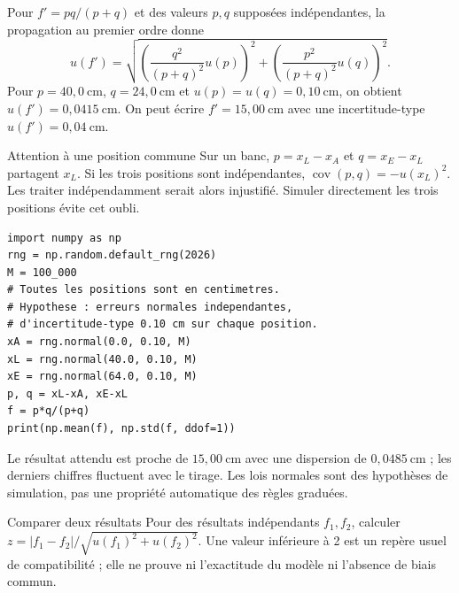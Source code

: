 Pour $f'=pq/(p+q)$ et des valeurs $p,q$ supposées indépendantes, la propagation au premier ordre donne
\[u(f')=\sqrt{\left(\frac{q^2}{(p+q)^2}u(p)\right)^2+
\left(\frac{p^2}{(p+q)^2}u(q)\right)^2}.\]
Pour $p=40{,}0\ \mathrm{cm}$, $q=24{,}0\ \mathrm{cm}$ et $u(p)=u(q)=0{,}10\ \mathrm{cm}$, on obtient $u(f')=0{,}0415\ \mathrm{cm}$. On peut écrire $f'=15{,}00\ \mathrm{cm}$ avec une incertitude-type $u(f')=0{,}04\ \mathrm{cm}$.
\begin{piege}{Attention à une position commune}
Sur un banc, $p=x_L-x_A$ et $q=x_E-x_L$ partagent $x_L$. Si les trois positions sont indépendantes, $\operatorname{cov}(p,q)=-u(x_L)^2$. Les traiter indépendamment serait alors injustifié. Simuler directement les trois positions évite cet oubli.
\end{piege}
\begingroup\small
\begin{verbatim}
import numpy as np
rng = np.random.default_rng(2026)
M = 100_000
# Toutes les positions sont en centimetres.
# Hypothese : erreurs normales independantes,
# d'incertitude-type 0.10 cm sur chaque position.
xA = rng.normal(0.0, 0.10, M)
xL = rng.normal(40.0, 0.10, M)
xE = rng.normal(64.0, 0.10, M)
p, q = xL-xA, xE-xL
f = p*q/(p+q)
print(np.mean(f), np.std(f, ddof=1))
\end{verbatim}
\endgroup
Le résultat attendu est proche de $15{,}00\ \mathrm{cm}$ avec une dispersion de $0{,}0485\ \mathrm{cm}$ ; les derniers chiffres fluctuent avec le tirage. Les lois normales sont des hypothèses de simulation, pas une propriété automatique des règles graduées.
\begin{methode}{Comparer deux résultats}
Pour des résultats indépendants $f_1,f_2$, calculer $z=|f_1-f_2|/\sqrt{u(f_1)^2+u(f_2)^2}$. Une valeur inférieure à 2 est un repère usuel de compatibilité ; elle ne prouve ni l'exactitude du modèle ni l'absence de biais commun.
\end{methode}

